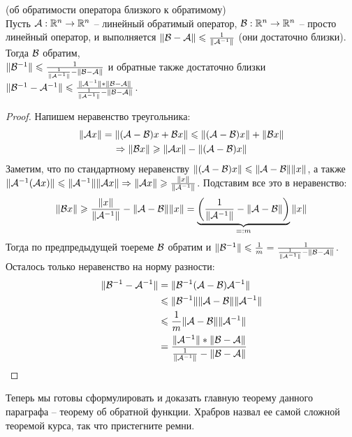 \begin{theorem} (об обратимости оператора близкого к обратимому) \\
    Пусть $\mathcal{A}: \mathbb{R}^n \to \mathbb{R}^n$ -- линейный обратимый оператор, $\mathcal{B}: \mathbb{R}^n \to \mathbb{R}^n$ -- просто линейный оператор, и выполняется $\| \mathcal{B} - \mathcal{A} \| \leqslant \frac{1}{\| \mathcal{A}^{-1} \|}$ (они достаточно близки).
    Тогда $\mathcal{B}$ обратим, \\ $\| \mathcal{B}^{-1} \| \leqslant \frac{1}{\frac{1}{\| \mathcal{A}^{-1} \|} - \| \mathcal{B} - \mathcal{A} \|}$ и обратные также достаточно близки $\| \mathcal{B}^{-1} - \mathcal{A}^{-1} \| \leqslant \frac{\| \mathcal{A}^{-1} \| * \| \mathcal{B} - \mathcal{A} \|}{\frac{1}{\| \mathcal{A}^{-1} \|} - \| \mathcal{B} - \mathcal{A} \|}$.
\end{theorem}
\begin{proof}
    Напишем неравенство треугольника: \begin{gather*}
        \| \mathcal{A} x \| = \| (\mathcal{A} - \mathcal{B})x + \mathcal{B} x \| \leqslant \| (\mathcal{A} - \mathcal{B})x \| + \| \mathcal{B} x \| \\
        \Rightarrow \| \mathcal{B} x \| \geqslant \| \mathcal{A} x \| - \| (\mathcal{A} - \mathcal{B})x \|
    \end{gather*}
    \quad Заметим, что по стандартному неравенству $\| (\mathcal{A} - \mathcal{B})x \| \leqslant \| \mathcal{A} - \mathcal{B} \| \| x \|$, а также $\| \mathcal{A}^{-1}(\mathcal{A} x) \| \leqslant \| \mathcal{A}^{-1} \| \| \mathcal{A} x \| \Rightarrow \| \mathcal{A} x \| \geqslant \frac{\| x \|}{\| \mathcal{A}^{-1} \| }$. 
    Подставим все это в неравенство: \begin{gather*}
        \| \mathcal{B} x \| \geqslant  \frac{\| x \|}{\| \mathcal{A}^{-1} \|} - \| \mathcal{A} - \mathcal{B} \| \| x \| = \underbrace{\left(\frac{1}{\| \mathcal{A}^{-1} \|} - \| \mathcal{A} - \mathcal{B} \| \right)}_{=: m} \| x \|
    \end{gather*}
    \quad Тогда по предпредыдущей тоереме $\mathcal{B}$ обратим и $\| \mathcal{B}^{-1} \| \leqslant \frac{1}{m} = \frac{1}{\frac{1}{\| \mathcal{A}^{-1} \|} - \| \mathcal{B} - \mathcal{A} \|}$. 
    Осталось только неравенство на норму разности: 
    \begin{align*} 
        \| \mathcal{B}^{-1} - \mathcal{A}^{-1} \| &= \| \mathcal{B}^{-1}(\mathcal{A} - \mathcal{B})\mathcal{A}^{-1} \| \\
        &\leqslant \| \mathcal{B}^{-1}\| \| \mathcal{A} - \mathcal{B} \| \| \mathcal{A}^{-1} \| \\
        &\leqslant \frac{1}{m}\| \mathcal{A} - \mathcal{B} \| \| \mathcal{A}^{-1} \| \\
        &= \frac{\| \mathcal{A}^{-1} \| * \| \mathcal{B} - \mathcal{A} \|}{\frac{1}{\| \mathcal{A}^{-1} \|} - \| \mathcal{B} - \mathcal{A} \|} 
    \end{align*}
\end{proof}

Теперь мы готовы сформулировать и доказать главную теорему данного параграфа -- теорему об обратной функции.
Храбров назвал ее самой сложной теоремой курса, так что пристегните ремни.

